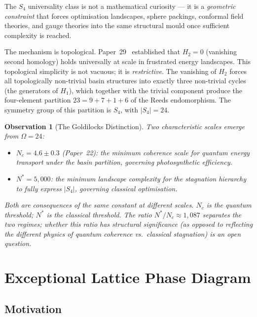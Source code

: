 \documentclass[11pt,a4paper]{article}
\newtheorem{observation}{Observation}[section]
\begin{document}
The $S_4$ universality class is not a mathematical curiosity --- it is a \emph{geometric constraint} that forces optimisation landscapes, sphere packings, conformal field theories, and gauge theories into the same structural mould once sufficient complexity is reached.

The mechanism is topological.
Paper~29~\cite{dwr_papers} established that $H_2 = 0$ (vanishing second homology) holds universally at scale in frustrated energy landscapes.
This topological simplicity is not vacuous; it is \emph{restrictive}.
The vanishing of $H_2$ forces all topologically non-trivial basin structures into exactly three non-trivial cycles (the generators of $H_1$), which together with the trivial component produce the four-element partition $23 = 9 + 7 + 1 + 6$ of the Reeds endomorphism.
The symmetry group of this partition is $S_4$, with $|S_4| = 24$.

\begin{observation}[The Goldilocks Distinction]\label{obs:goldilocks}
Two characteristic scales emerge from $\Omega = 24$:
\begin{itemize}[nosep]
\item $N_c = 4.6 \pm 0.3$ (Paper~22): the minimum coherence scale for quantum energy transport under the basin partition, governing photosynthetic efficiency.
\item $N^* = 5{,}000$: the minimum landscape complexity for the stagnation hierarchy to fully express $|S_4|$, governing classical optimisation.
\end{itemize}
Both are consequences of the same constant at different scales.
$N_c$ is the quantum threshold; $N^*$ is the classical threshold.
The ratio $N^*/N_c \approx 1{,}087$ separates the two regimes; whether this ratio has structural significance (as opposed to reflecting the different physics of quantum coherence vs.\ classical stagnation) is an open question.
\end{observation}


\section{Exceptional Lattice Phase Diagram}\label{sec:lattice}

\subsection{Motivation}
\end{document}

